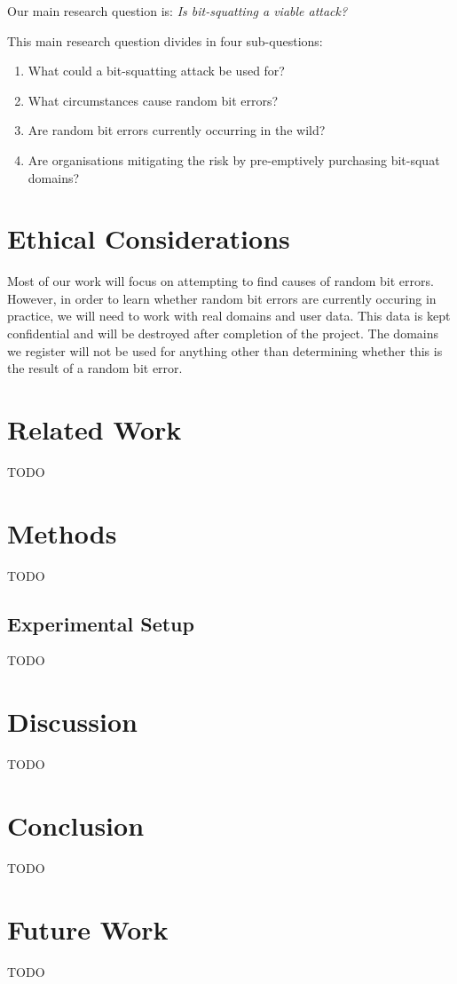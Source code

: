 \documentclass[conference]{IEEEtran}
\begin{document}
Our main research question is:
{\it Is bit-squatting a viable attack?}

\vspace{0.1cm}

\noindent{} This main research question divides in four sub-questions:

\begin{enumerate}
    \item What could a bit-squatting attack be used for?
	\item What circumstances cause random bit errors?
	\item Are random bit errors currently occurring in the wild? %
	\item Are organisations mitigating the risk by pre-emptively purchasing
	      bit-squat domains?
\end{enumerate}


\section{Ethical Considerations}\label{sec:ethics}

Most of our work will focus on attempting to find causes of random bit errors.
However, in order to learn whether random bit errors are currently occuring in
practice, we will need to work with real domains and user data. This data is
kept confidential and will be destroyed after completion of the project. The
domains we register will not be used for anything other than determining
whether this is the result of a random bit error.


\section{Related Work}\label{sec:relwork}

TODO


\section{Methods}\label{sec:method}

TODO


\subsection{Experimental Setup}\label{sec:setup}

TODO


\section{Discussion}\label{sec:disc}

TODO


\section{Conclusion}\label{sec:conc}

TODO


\section{Future Work}\label{sec:futwork}

TODO


\printbibliography
\end{document}
